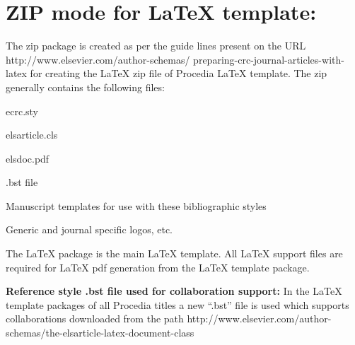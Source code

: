 \documentclass[5p,times,procedia]{elsarticle}
\begin{document}
\section{ZIP mode for LaTeX template:}

The zip package is created as per the guide lines present on the URL http://www.elsevier.com/author-schemas/ preparing-crc-journal-articles-with-latex for creating the LaTeX zip file of Procedia LaTeX template.  The zip generally contains the following files:
\begin{Itemize}[]\leftskip-12.7pt
\item ecrc.sty
\item  elsarticle.cls
\item elsdoc.pdf
\item .bst file
\item Manuscript templates for use with these bibliographic styles
\item  Generic and journal specific logos, etc.
\end{Itemize}

The LaTeX package is the main LaTeX template. All LaTeX support files are required for LaTeX pdf generation from the LaTeX template package. 

{\bf Reference style .bst file used for collaboration support:} In the LaTeX template packages of all Procedia titles a new ``.bst'' file is used which supports collaborations downloaded from the path http://www.elsevier.com/author-schemas/the-elsarticle-latex-document-class
\end{document}
